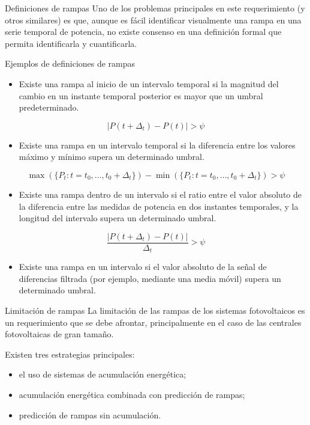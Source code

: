 \documentclass[aspectratio=169, usenames,svgnames,dvipsnames]{beamer}
\begin{document}
\begin{frame}[label={sec:org69bae41}]{Definiciones de rampas}
Uno de los problemas principales en este requerimiento (y otros similares) es que, aunque \alert{es fácil identificar visualmente una rampa} en una serie temporal de potencia, \alert{no existe consenso en una definición formal} que permita identificarla y cuantificarla.
\end{frame}

\begin{frame}[label={sec:orge7c250a}]{Ejemplos de definiciones de rampas}
\begin{itemize}
\item Existe una rampa al inicio de un intervalo temporal si la magnitud del cambio en un instante temporal posterior es mayor que un umbral predeterminado.
\end{itemize}
\[ 
\left| P(t +\Delta_t) - P(t)\right| > \psi
\]

\begin{itemize}
\item Existe una rampa en un intervalo temporal si la diferencia entre los
valores máximo y mínimo supera un determinado umbral.
\end{itemize}
\[
\max(\{P_t: t = t_0, \dots, t_0+\Delta_t\}) - \min(\{P_t: t=t_0,
\dots, t_0+\Delta_t\}) > \psi
\]

\begin{itemize}
\item Existe una rampa dentro de un intervalo si el ratio entre el valor absoluto de la diferencia entre las medidas de potencia en dos instantes temporales, y la longitud del intervalo supera un determinado umbral.
\end{itemize}
\[
\frac{\left|P(t + \Delta_t) - P(t)\right|}{\Delta_t} > \psi
\]

\begin{itemize}
\item Existe una rampa en un intervalo si el valor absoluto de la señal de diferencias filtrada (por ejemplo, mediante una media móvil) supera un determinado umbral.
\end{itemize}
\end{frame}

\begin{frame}[label={sec:org1c2afc3}]{Limitación de rampas}
La limitación de las rampas de los sistemas fotovoltaicos es un
requerimiento que se debe afrontar, principalmente en el caso de las
centrales fotovoltaicas de gran tamaño.

Existen \alert{tres estrategias} principales:
\begin{itemize}
\item el uso de \alert{sistemas de acumulación} energética;
\item \alert{acumulación} energética combinada \alert{con predicción} de rampas;
\item \alert{predicción} de rampas \alert{sin acumulación}.
\end{itemize}
\end{frame}
\end{document}
